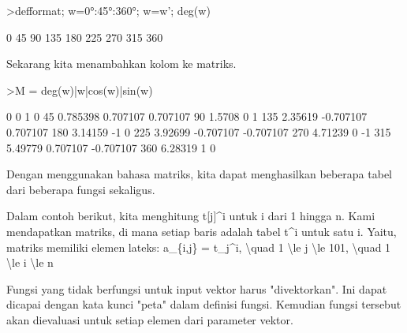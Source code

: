 \documentclass[a4paper,10pt]{article}
\begin{document}
\begin{eulernotebook}
\begin{eulercomment}
\begin{eulercomment}
\begin{eulercomment}
\begin{eulercomment}
\begin{eulerprompt}
>defformat; w=0°:45°:360°; w=w'; deg(w)
\end{eulerprompt}
\begin{euleroutput}
              0 
             45 
             90 
            135 
            180 
            225 
            270 
            315 
            360 
\end{euleroutput}
\begin{eulercomment}
Sekarang kita menambahkan kolom ke matriks.
\end{eulercomment}
\begin{eulerprompt}
>M = deg(w)|w|cos(w)|sin(w)
\end{eulerprompt}
\begin{euleroutput}
              0             0             1             0 
             45      0.785398      0.707107      0.707107 
             90        1.5708             0             1 
            135       2.35619     -0.707107      0.707107 
            180       3.14159            -1             0 
            225       3.92699     -0.707107     -0.707107 
            270       4.71239             0            -1 
            315       5.49779      0.707107     -0.707107 
            360       6.28319             1             0 
\end{euleroutput}
\begin{eulercomment}
Dengan menggunakan bahasa matriks, kita dapat menghasilkan beberapa
tabel dari beberapa fungsi sekaligus.

Dalam contoh berikut, kita menghitung t[j]\textasciicircum{}i untuk i dari 1 hingga n.
Kami mendapatkan matriks, di mana setiap baris adalah tabel t\textasciicircum{}i untuk
satu i. Yaitu, matriks memiliki elemen lateks: a\_\{i,j\} = t\_j\textasciicircum{}i, \textbackslash{}quad
1 \textbackslash{}le j \textbackslash{}le 101, \textbackslash{}quad 1 \textbackslash{}le i \textbackslash{}le n

Fungsi yang tidak berfungsi untuk input vektor harus "divektorkan".
Ini dapat dicapai dengan kata kunci "peta" dalam definisi fungsi.
Kemudian fungsi tersebut akan dievaluasi untuk setiap elemen dari
parameter vektor.


\end{eulercomment}
\end{eulercomment}
\end{eulercomment}
\end{eulercomment}
\end{eulercomment}
\end{eulernotebook}
\end{document}
